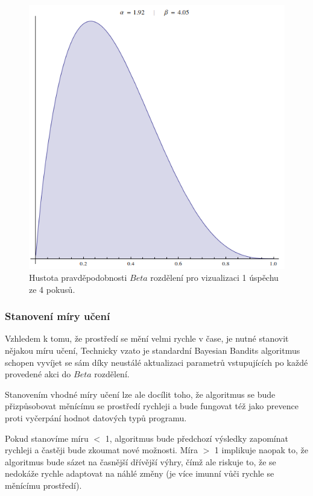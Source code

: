 \documentclass[thesis=M,czech]{FITthesis}[2014/05/07]
\begin{document}
\begin{figure}\centering
	\includegraphics[width=1.0\textwidth]{obr/beta2.png}
 	\caption[Hustota pravděpodobnosti $Beta$ rozdělení pro vizualizaci 1 úspěchu ze 4 pokusů.]{Hustota pravděpodobnosti $Beta$ rozdělení pro vizualizaci 1 úspěchu ze 4 pokusů.}\label{fig:beta2}
\end{figure}	

\subsubsection{Stanovení míry učení}
\label{rate}
Vzhledem k tomu, že prostředí se mění velmi rychle v čase, je nutné stanovit nějakou míru učení, Technicky vzato je standardní Bayesian Bandits algoritmus schopen vyvíjet se sám díky neustálé aktualizaci parametrů vstupujících po každé provedené akci do ${Beta}$ rozdělení.

Stanovením vhodné míry učení lze ale docílit toho, že algoritmus se bude přizpůsobovat měnícímu se prostředí rychleji a bude fungovat též jako prevence proti vyčerpání hodnot datových typů programu.

Pokud stanovíme míru $<$ 1, algoritmus bude předchozí výsledky zapomínat rychleji a častěji bude zkoumat nové možnosti. Míra $>$ 1 implikuje naopak to, že algoritmus bude sázet na časnější dřívější výhry, čímž ale riskuje to, že se nedokáže rychle adaptovat na náhlé změny (je více imunní vůči rychle se měnícímu prostředí).
\end{document}
